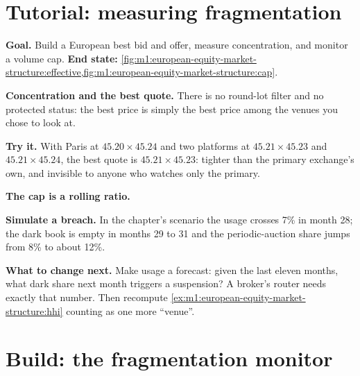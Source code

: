 \section{Tutorial: measuring fragmentation}\label{tut:m1:european-equity-market-structure:frag}

\begin{tutorial}
\textbf{Goal.} Build a European best bid and offer, measure concentration,
and monitor a volume cap. \textbf{End state:}
\cref{fig:m1:european-equity-market-structure:effective,fig:m1:european-equity-market-structure:cap}.
\begin{tutsteps}
\item \textbf{Concentration and the best quote.} There is no round-lot filter
and no protected status: the best price is simply the best price among the
venues you chose to look at.
\label{lst:m1:european-equity-market-structure:hhi}
\item \textbf{Try it.} With Paris at $45.20 \times 45.24$ and two platforms
at $45.21 \times 45.23$ and $45.21 \times 45.24$, the best quote is $45.21
\times 45.23$: tighter than the primary exchange's own, and invisible to
anyone who watches only the primary.
\item \textbf{The cap is a rolling ratio.}
\label{lst:m1:european-equity-market-structure:cap}
\item \textbf{Simulate a breach.} In the chapter's scenario the usage crosses
7\% in month 28; the dark book is empty in months 29 to 31 and the
periodic-auction share jumps from 8\% to about 12\%.
\end{tutsteps}
\textbf{What to change next.} Make usage a forecast: given the last eleven
months, what dark share next month triggers a suspension? A broker's router
needs exactly that number. Then recompute
\cref{ex:m1:european-equity-market-structure:hhi} counting  as one more ``venue''.
\end{tutorial}

\section{Build: the fragmentation monitor}\label{bld:m1:european-equity-market-structure:monitor}

